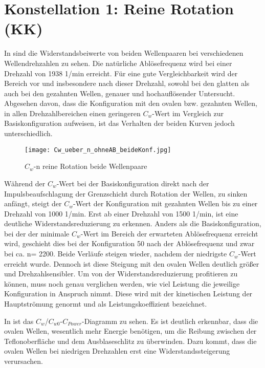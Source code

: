 \section{Konstellation 1: Reine Rotation (KK)}
\label{s:ReineRotation}

In   sind die Widerstandsbeiwerte von beiden Wellenpaaren bei verschiedenen Wellendrehzahlen zu sehen.
Die nat\"urliche Abl\"osefrequenz wird bei einer Drehzahl von 1938 1/min  erreicht. F\"ur eine gute Vergleichbarkeit wird der Bereich vor und insbesondere nach dieser Drehzahl, sowohl bei den glatten als auch bei den gezahnten Wellen, genauer und hochaufl\"osender Untersucht.
Abgesehen davon, dass die Konfiguration mit den ovalen bzw. gezahnten Wellen, in allen Drehzahlbereichen einen geringeren $C_{w}$-Wert im Vergleich zur Basiskonfiguration aufweisen, ist das Verhalten der beiden Kurven jedoch unterschiedlich.
\begin{figure}[h]
	\centering
	\texttt{[image: Cw\_ueber\_n\_ohneAB\_beideKonf.jpg]}
	\caption{ $C_{w}$-n reine Rotation beide Wellenpaare }
	\label{fig:Cw-n_Rein_Konf+2}
\end{figure}

W\"ahrend der $C_{w}$-Wert bei der Basiskonfiguration direkt nach der Impulsbeaufschlagung der Grenzschicht durch Rotation der Wellen, zu sinken anf\"angt, steigt der $C_{w}$-Wert der Konfiguration mit gezahnten Wellen bis zu einer Drehzahl von 1000 1/min. Erst ab einer Drehzahl von 1500 1/min, ist eine deutliche Widerstandsreduzierung zu erkennen. 
Anders als die Basiskonfiguration, bei der der minimale $C_{w}$-Wert im Bereich der erwarteten Abl\"osefrequenz erreicht wird, geschieht dies bei der Konfiguration 50 nach der Abl\"osefrequenz und zwar bei ca. n= 2200. 
Beide Verl\"aufe steigen wieder, nachdem der niedrigste $C_{w}$-Wert erreicht wurde. Dennoch ist diese
Steigung mit den ovalen Wellen deutlich gr\"o\ss{}er und Drehzahlsensibler.
Um von der Widerstandsreduzierung profitieren zu k\"onnen, muss noch genau verglichen werden, wie viel Leistung die jeweilige Konfiguration in Anspruch nimmt. Diese wird mit der kinetischen Leistung der Hauptstr\"omung genormt und als Leistungskoeffizient bezeichnet.

In  ist das $C_{w}$/$C_{w0}$-$C_{Power}$-Diagramm zu sehen. Es ist deutlich erkennbar, dass die ovalen Wellen, wesentlich mehr Energie ben\"otigen, um die Reibung zwischen der Teflonoberfl\"ache und dem Ausblaseschlitz zu \"uberwinden. Dazu kommt, dass die ovalen Wellen bei niedrigen Drehzahlen erst eine Widerstandssteigerung verursachen. 

